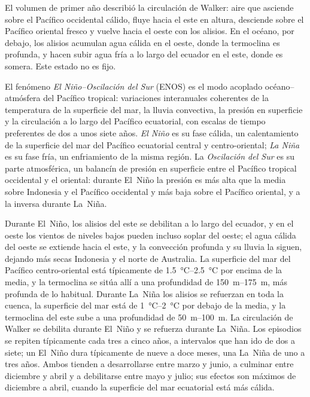 El volumen de primer año describió la circulación de Walker: aire que asciende sobre el Pacífico occidental cálido,
fluye hacia el este en altura, desciende sobre el Pacífico oriental fresco y vuelve hacia el oeste con los
alisios. En el océano, por debajo, los alisios acumulan agua cálida en el oeste, donde la termoclina es
profunda, y hacen subir agua fría a lo largo del ecuador en el este, donde es somera. Este estado no es
fijo.

\begin{definition}\label{def:b2:climate-variability:enso}
El fenómeno \emph{El Niño--Oscilación del Sur} (ENOS) es el
modo acoplado océano--atmósfera del Pacífico tropical: variaciones interanuales coherentes de la
temperatura de la superficie del mar, la lluvia convectiva, la presión en superficie y la circulación a lo largo
del Pacífico ecuatorial, con escalas de tiempo preferentes de dos a unos siete años. \emph{El
Niño} es su fase cálida, un calentamiento de la superficie del mar del Pacífico ecuatorial central
y centro-oriental; \emph{La Niña} es su fase fría, un enfriamiento de la
misma región. La \emph{Oscilación del Sur} es su parte atmosférica,
un balancín de presión en superficie entre el Pacífico tropical occidental y el oriental: durante El~Niño
la presión es más alta que la media sobre Indonesia y el Pacífico occidental y más baja sobre el
Pacífico oriental, y a la inversa durante La~Niña.
\end{definition}

Durante El~Niño, los alisios del este se debilitan a lo largo del ecuador, y en el oeste los
vientos de niveles bajos pueden incluso soplar del oeste; el agua cálida del oeste se extiende hacia el este, y la
convección profunda y su lluvia la siguen, dejando más secas Indonesia y el norte de Australia. La superficie del mar
del Pacífico centro-oriental está típicamente de \qtyrange{1.5}{2.5}{\celsius} por encima de la media, y
la termoclina se sitúa allí a una profundidad de \qtyrange{150}{175}{m}, más profunda de lo habitual. Durante La~Niña los
alisios se refuerzan en toda la cuenca, la superficie del mar está de \qtyrange{1}{2}{\celsius} por debajo de la
media, y la termoclina del este sube a una profundidad de \qtyrange{50}{100}{m}. La circulación de Walker
se debilita durante El~Niño y se refuerza durante La~Niña. Los episodios se repiten típicamente cada tres a
cinco años, a intervalos que han ido de dos a siete; un El~Niño dura típicamente de nueve a
doce meses, una La~Niña de uno a tres años. Ambos tienden a desarrollarse entre marzo y junio, a
culminar entre diciembre y abril y a debilitarse entre mayo y julio; sus efectos son máximos
de diciembre a abril, cuando la superficie del mar ecuatorial está más cálida.

